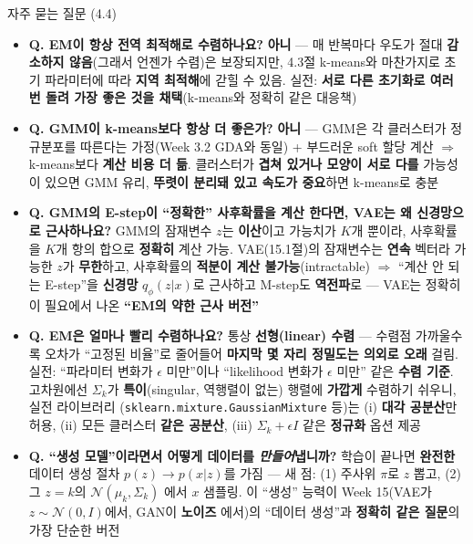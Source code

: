 \begin{frame}{자주 묻는 질문 (4.4)}
  \small
  \begin{itemize}
    \item \textbf{Q. EM이 항상 전역 최적해로 수렴하나요?}
      \textbf{아니} --- 매 반복마다 우도가 절대 \textbf{감소하지
      않음}(그래서 언젠가 수렴)은 보장되지만, 4.3절 k-means와
      마찬가지로 초기 파라미터에 따라 \textbf{지역 최적해}에
      갇힐 수 있음. 실전: \textbf{서로 다른 초기화로 여러 번
      돌려 가장 좋은 것을 채택}(k-means와 정확히 같은 대응책)
    \item \textbf{Q. GMM이 k-means보다 항상 더 좋은가?}
      \textbf{아니} --- GMM은 각 클러스터가 정규분포를 따른다는
      가정(Week 3.2 GDA와 동일) + 부드러운 soft 할당 계산
      $\Rightarrow$ k-means보다 \textbf{계산 비용 더 듦}.
      클러스터가 \textbf{겹쳐 있거나 모양이 서로 다를} 가능성이
      있으면 GMM 유리, \textbf{뚜렷이 분리돼 있고 속도가
      중요}하면 k-means로 충분
    \item \textbf{Q. GMM의 E-step이 ``정확한'' 사후확률을 계산
      한다면, VAE는 왜 신경망으로 근사하나요?}
      GMM의 잠재변수 $z$는 \textbf{이산}이고 가능치가 $K$개
      뿐이라, 사후확률을 $K$개 항의 합으로 \textbf{정확히}
      계산 가능. VAE(15.1절)의 잠재변수는 \textbf{연속}
      벡터라 가능한 $z$가 \textbf{무한}하고, 사후확률의
      \textbf{적분이 계산 불가능}(intractable)
      $\Rightarrow$ ``계산 안 되는 E-step''을 \textbf{신경망}
      $q_\phi(z|x)$로 근사하고 M-step도 \textbf{역전파}로
      --- VAE는 정확히 이 필요에서 나온 \textbf{``EM의 약한
      근사 버전''}
    \item \textbf{Q. EM은 얼마나 빨리 수렴하나요?}
      통상 \textbf{선형(linear) 수렴} --- 수렴점 가까울수록
      오차가 ``고정된 비율''로 줄어들어 \textbf{마지막 몇 자리
      정밀도는 의외로 오래} 걸림. 실전: ``파라미터 변화가
      $\epsilon$ 미만''이나 ``likelihood 변화가 $\epsilon$
      미만'' 같은 \textbf{수렴 기준}. 고차원에선 $\Sigma_k$가
      \textbf{특이}(singular, 역행렬이 없는) 행렬에 \textbf{가깝게}
      수렴하기 쉬우니, 실전 라이브러리
      (\texttt{sklearn.mixture.GaussianMixture} 등)는
      (i) \textbf{대각 공분산}만 허용, (ii) 모든 클러스터
      \textbf{같은 공분산}, (iii) $\Sigma_k + \epsilon I$ 같은
      \textbf{정규화} 옵션 제공
    \item \textbf{Q. ``생성 모델''이라면서 어떻게 데이터를
      \emph{만들어}냅니까?}
      학습이 끝나면 \textbf{완전한} 데이터 생성 절차
      $p(z) \to p(x|z)$를 가짐 --- 새 점: (1) 주사위 $\pi$로
      $z$ 뽑고, (2) 그 $z = k$의 $\mathcal{N}(\mu_k, \Sigma_k)$
      에서 $x$ 샘플링. 이 ``생성'' 능력이 Week 15(VAE가
      $z \sim \mathcal{N}(0, I)$에서, GAN이 \textbf{노이즈}
     에서)의 ``데이터 생성''과 \textbf{정확히 같은 질문}의
      가장 단순한 버전
  \end{itemize}
\end{frame}
